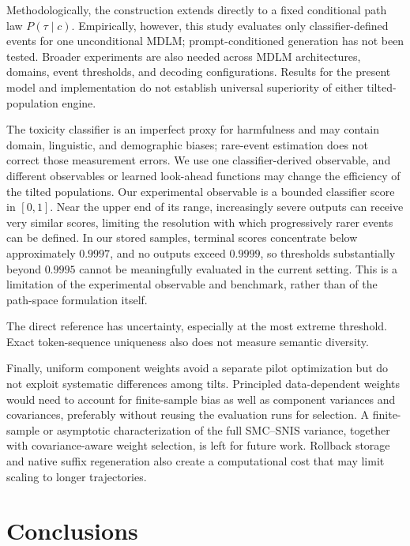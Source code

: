 \documentclass{article}
\begin{document}
Methodologically, the construction extends directly to a fixed conditional
path law $P(\tau\mid c)$. Empirically, however, this study evaluates only
classifier-defined events for one unconditional MDLM; prompt-conditioned
generation has not been tested. Broader experiments are also needed across
MDLM architectures, domains, event thresholds, and decoding configurations.
Results for the present model and implementation do not establish universal
superiority of either tilted-population engine.

The toxicity classifier is an imperfect proxy for harmfulness and may contain
domain, linguistic, and demographic biases; rare-event estimation does not
correct those measurement errors. We use one classifier-derived observable,
and different observables or learned look-ahead functions may change the
efficiency of the tilted populations. Our experimental observable is a bounded
classifier score in $[0,1]$. Near
the upper end of its range, increasingly severe outputs can receive very
similar scores, limiting the resolution with which progressively rarer events
can be defined. In our stored samples, terminal scores concentrate below
approximately $0.9997$, and no outputs exceed $0.9999$, so thresholds
substantially beyond $0.9995$ cannot be meaningfully evaluated in the current
setting. This is a limitation of the experimental observable and benchmark,
rather than of the path-space formulation itself.

The direct reference has
uncertainty, especially at the most extreme threshold. Exact token-sequence uniqueness also does not measure semantic
diversity.

Finally, uniform component weights avoid a separate pilot optimization but do
not exploit systematic differences among tilts. Principled data-dependent
weights would need to account for finite-sample bias as well as component
variances and covariances, preferably without reusing the evaluation runs for
selection. A finite-sample or asymptotic characterization of the full
SMC--SNIS variance, together with covariance-aware weight selection, is left
for future work. Rollback storage and native suffix regeneration also create a
computational cost that may limit scaling to longer trajectories.
\section{Conclusions}
\end{document}
